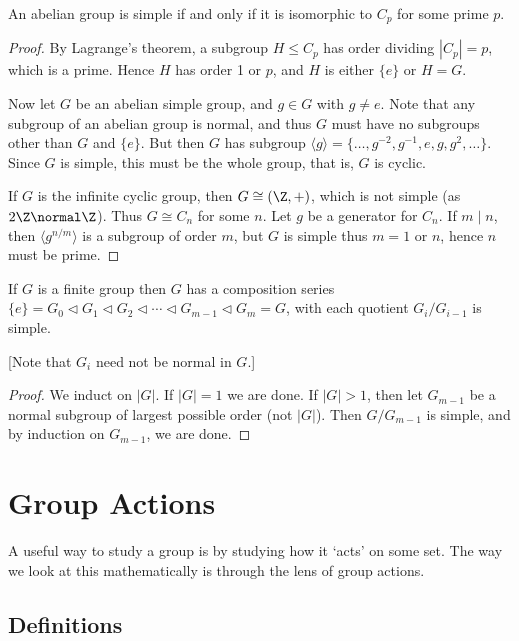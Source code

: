 \begin{lemma}
	An abelian group is simple if and only if it is isomorphic to $C_p$ for some prime $p$.
\end{lemma}
\begin{proof}
	By Lagrange's theorem, a subgroup $H \leq C_p$ has order dividing $|C_p| = p$, which is a prime. Hence $H$ has order 1 or $p$, and $H$ is either $\{e\}$ or $H = G$.

	Now let $G$ be an abelian simple group, and $g \in G$ with $g \neq e$. Note that any subgroup of an abelian group is normal, and thus $G$ must have no subgroups other than $G$ and $\{e\}$. But then $G$ has subgroup $\langle g \rangle = \{\dots, g^{-2}, g^{-1}, e, g, g^2, \dots \}$. Since $G$ is simple, this must be the whole group, that is, $G$ is cyclic.

	If $G$ is the infinite cyclic group, then $G \cong (\Z, +)$, which is not simple (as $2 \Z \normal \Z$). Thus $G \cong C_n$ for some $n$. Let $g$ be a generator for $C_n$. If $m \mid n$, then $\langle g^{n/m} \rangle$ is a subgroup of order $m$, but $G$ is simple thus $m = 1$ or $n$, hence $n$ must be prime.
\end{proof}

\begin{lemma}
	If $G$ is a finite group then $G$ has a composition series $\{e\} = G_0 \triangleleft G_1 \triangleleft G_2 \triangleleft \cdots \triangleleft G_{m- 1} \triangleleft G_m = G$, with each quotient $G_i / G_{i - 1}$ is simple.

	[Note that $G_i$ need not be normal in $G$.]
\end{lemma}
\begin{proof}
	We induct on $|G|$. If $|G| = 1$ we are done. If $|G| > 1$, then let $G_{m - 1}$ be a normal subgroup of largest possible order (not $|G|$). Then $G/G_{m - 1}$ is simple, and by induction on $G_{m - 1}$, we are done.
\end{proof}


\section{Group Actions}

A useful way to study a group is by studying how it `acts' on some set.
The way we look at this mathematically is through the lens of group actions.

\subsection{Definitions}

